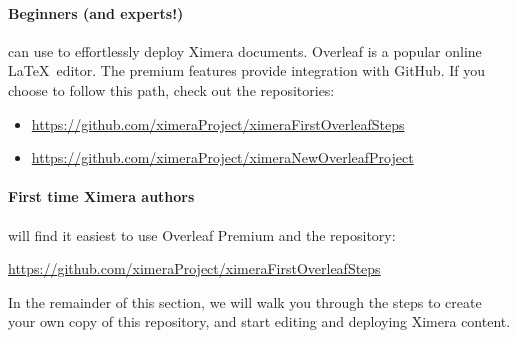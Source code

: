 \documentclass{ximera}
\begin{document}
\paragraph{Beginners (and experts!)} can use  to effortlessly deploy Ximera documents.
Overleaf is a popular online \LaTeX\ editor. The premium features provide integration with GitHub. If you choose to follow this path, check 
out the repositories:
        \begin{itemize}
    \item \url{https://github.com/ximeraProject/ximeraFirstOverleafSteps}            %
    \item \url{https://github.com/ximeraProject/ximeraNewOverleafProject}
\end{itemize}


\paragraph{First time Ximera authors} will find it easiest to use Overleaf Premium and the repository:
\begin{center}
     \url{https://github.com/ximeraProject/ximeraFirstOverleafSteps}            %
\end{center}
In the remainder of this section, we will walk you through the steps to create your own copy of this repository, 
and start editing and deploying Ximera content. 
\end{document}
